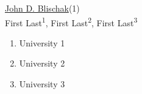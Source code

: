 

\iflatexml
  \href{https://www.authorea.com/users/5990}{John D. Blischak}(1)\\
\else
  First Last\textsuperscript{1}, First Last\textsuperscript{2}, First Last\textsuperscript{3}
  
  \begin{enumerate}
  \item University 1
  \item University 2
  \item University 3
  \end{enumerate}
\fi
